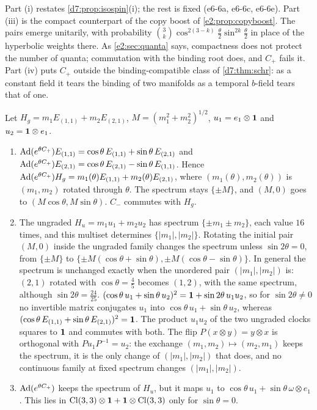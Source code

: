 Part (i) restates \cref{d7:prop:isospin}(i); the rest is fixed (e6-6a, e6-6c, e6-6e). Part (iii) is the compact counterpart of the copy boost
of \cref{e2:prop:copyboost}. The pairs emerge unitarily, with probability $\binom3k\cos^{2(3-k)}\tfrac\theta2\sin^{2k}\tfrac\theta2$ in place of the hyperbolic
weights there. As \cref{e2:sec:quanta} says, compactness does not protect the number of quanta; commutation with the binding root does, and $C_+$
fails it. Part (iv) puts $C_+$ outside the binding-compatible class of \cref{d7:thm:schr}: as a constant field it tears the binding of two
manifolds as a temporal $b$-field tears that of one.

\begin{proposition}
\label{e6:prop:transfer}
Let $H_g=m_1E_{(1,1)}+m_2E_{(2,1)}$, $M=(m_1^2+m_2^2)^{1/2}$, $u_1=e_1\otimes\mathbf 1$ and $u_2=\mathbf 1\otimes e_1$.
\begin{enumerate}[label=(\roman*),leftmargin=2.2em]
\item $\operatorname{Ad}(e^{\theta C_+})E_{(1,1)}=\cos\theta\,E_{(1,1)}+\sin\theta\,E_{(2,1)}$ and $\operatorname{Ad}(e^{\theta C_+})E_{(2,1)}=\cos\theta\,E_{(2,1)}-\sin\theta\,E_{(1,1)}$. Hence
$\operatorname{Ad}(e^{\theta C_+})H_g=m_1(\theta)E_{(1,1)}+m_2(\theta)E_{(2,1)}$, where $(m_1(\theta),m_2(\theta))$ is $(m_1,m_2)$ rotated through $\theta$. The spectrum stays $\{\pm M\}$, and
$(M,0)$ goes to $(M\cos\theta,M\sin\theta)$. $C_-$ commutes with $H_g$.
\item The ungraded $H_u=m_1u_1+m_2u_2$ has spectrum $\{\pm m_1\pm m_2\}$, each value $16$ times, and this multiset determines $\{|m_1|,|m_2|\}$. Rotating
the initial pair $(M,0)$ inside the ungraded family changes the spectrum unless $\sin2\theta=0$, from $\{\pm M\}$ to
$\{\pm M(\cos\theta+\sin\theta),\pm M(\cos\theta-\sin\theta)\}$. In general the spectrum is unchanged exactly when the unordered pair $(|m_1|,|m_2|)$ is: $(2,1)$
rotated with $\cos\theta=\tfrac45$ becomes $(1,2)$, with the same spectrum, although $\sin2\theta=\tfrac{24}{25}$.
$(\cos\theta\,u_1+\sin\theta\,u_2)^2=\mathbf 1+\sin2\theta\,u_1u_2$, so for $\sin2\theta\neq0$ no invertible matrix conjugates $u_1$ into $\cos\theta\,u_1+\sin\theta\,u_2$,
whereas $(\cos\theta\,E_{(1,1)}+\sin\theta\,E_{(2,1)})^2=\mathbf 1$. The product $u_1u_2$ of the two ungraded clocks squares to $\mathbf 1$ and commutes with both. The flip $P(x\otimes y)=y\otimes x$ is orthogonal with
$Pu_1P^{-1}=u_2$: the exchange $(m_1,m_2)\mapsto(m_2,m_1)$ keeps the spectrum, it is the only change of $(|m_1|,|m_2|)$ that does, and no continuous
family at fixed spectrum changes $(|m_1|,|m_2|)$.
\item $\operatorname{Ad}(e^{\theta C_+})$ keeps the spectrum of $H_u$, but it maps $u_1$ to $\cos\theta\,u_1+\sin\theta\,\omega\otimes e_1$. This lies in
$\mathrm{Cl}(3,3)\otimes\mathbf 1+\mathbf 1\otimes\mathrm{Cl}(3,3)$ only for $\sin\theta=0$.
\end{enumerate}
\end{proposition}

